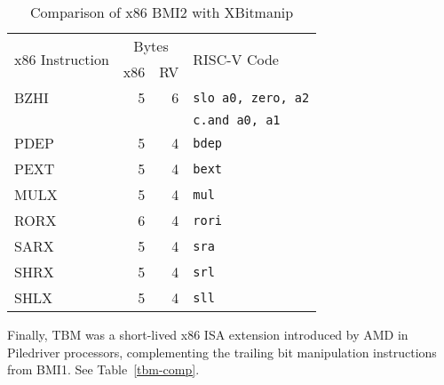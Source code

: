 \begin{table}[h]
\centering
\begin{tabular}{lrrl}
\multirow{2}{*}{x86 Instruction} & \multicolumn{2}{c}{Bytes} & \multirow{2}{*}{RISC-V Code} \\
& x86 & RV & \\
\hline
BZHI     & 5 &  6 & {\tt slo a0, zero, a2} \\
         &   &    & {\tt c.and a0, a1} \\
\hline
PDEP     & 5 &  4 & {\tt bdep} \\
\hline
PEXT     & 5 &  4 & {\tt bext} \\
\hline
MULX     & 5 &  4 & {\tt mul} \\
\hline
RORX     & 6 &  4 & {\tt rori} \\
\hline
SARX     & 5 &  4 & {\tt sra} \\
\hline
SHRX     & 5 &  4 & {\tt srl} \\
\hline
SHLX     & 5 &  4 & {\tt sll} \\
\end{tabular}
\caption{Comparison of x86 BMI2 with XBitmanip}
\label{bmi2-comp}
\end{table}

Finally, TBM was a short-lived x86 ISA extension introduced by AMD in
Piledriver processors, complementing the trailing bit manipulation instructions
from BMI1. See Table~\ref{tbm-comp}.

